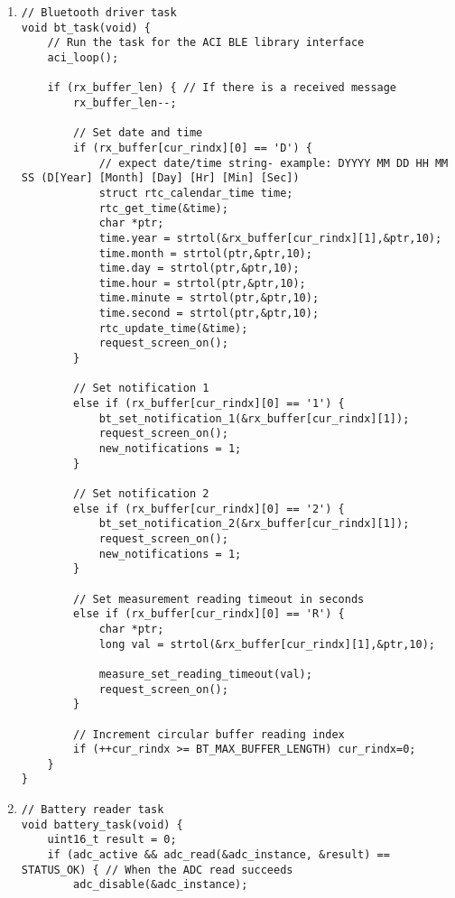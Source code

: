 \begin{enumerate}[label=\textbf{S.\arabic*},ref=S.\arabic*{ of Appendix A}]
\item \label{bt_task}
\begin{adjustwidth}{-2em}{0pt}
\singlespacing
\nl
\begin{lstlisting}
// Bluetooth driver task
void bt_task(void) {
    // Run the task for the ACI BLE library interface
    aci_loop();

    if (rx_buffer_len) { // If there is a received message
        rx_buffer_len--;

        // Set date and time
        if (rx_buffer[cur_rindx][0] == 'D') {
            // expect date/time string- example: DYYYY MM DD HH MM SS (D[Year] [Month] [Day] [Hr] [Min] [Sec])
            struct rtc_calendar_time time;
            rtc_get_time(&time);
            char *ptr;
            time.year = strtol(&rx_buffer[cur_rindx][1],&ptr,10);
            time.month = strtol(ptr,&ptr,10);
            time.day = strtol(ptr,&ptr,10);
            time.hour = strtol(ptr,&ptr,10);
            time.minute = strtol(ptr,&ptr,10);
            time.second = strtol(ptr,&ptr,10);
            rtc_update_time(&time);
            request_screen_on();
        }

        // Set notification 1
        else if (rx_buffer[cur_rindx][0] == '1') {
            bt_set_notification_1(&rx_buffer[cur_rindx][1]);
            request_screen_on();
            new_notifications = 1;
        }

        // Set notification 2
        else if (rx_buffer[cur_rindx][0] == '2') {
            bt_set_notification_2(&rx_buffer[cur_rindx][1]);
            request_screen_on();
            new_notifications = 1;
        }

        // Set measurement reading timeout in seconds
        else if (rx_buffer[cur_rindx][0] == 'R') {
            char *ptr;
            long val = strtol(&rx_buffer[cur_rindx][1],&ptr,10);

            measure_set_reading_timeout(val);
            request_screen_on();
        }

        // Increment circular buffer reading index
        if (++cur_rindx >= BT_MAX_BUFFER_LENGTH) cur_rindx=0;
    }
}
\end{lstlisting}
\end{adjustwidth}
\doublespacing

\item \label{battery_task}
\begin{adjustwidth}{-2em}{0pt}
\singlespacing
\nl
\begin{lstlisting}
// Battery reader task
void battery_task(void) {
    uint16_t result = 0;
    if (adc_active && adc_read(&adc_instance, &result) == STATUS_OK) { // When the ADC read succeeds
        adc_disable(&adc_instance);


\end{lstlisting}
\end{adjustwidth}
\end{enumerate}
